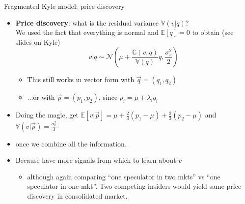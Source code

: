 \documentclass[english,10pt
,aspectratio=169
]{beamer}
\begin{document}
\begin{frame}{Fragmented Kyle model: price discovery}
	\begin{itemize}
		\item \textbf{Price discovery}: what is the residual variance $\mathbb{V}(v|q)$? \\
		We used the fact that everything is normal and $\mathbb{E}[q]=0$ to obtain (see slides on Kyle)
		$$
			v|q \sim \mathcal{N} \left( \mu +\frac{\mathbb{C}(v,q)}{\mathbb{V}(q)} q, \frac{\sigma^2_v}{2} \right)
		$$
		\begin{itemize}
			\item This still works in vector form with $\vec{q}=(q_1,q_2)$
			\item ...or with $\vec{p}=(p_1,p_2)$, since $p_i = \mu + \lambda_i q_i$
		\end{itemize}
		\pause
		\item Doing the magic, get $\mathbb{E}[v|\vec{p}] = \mu + \frac{2}{3}(p_1 - \mu) + \frac{2}{3}(p_2 - \mu)$ and $\mathbb{V}(v|\vec{p}) = \frac{\sigma^2_v}{3}$
		\item {} once we combine all the information.
		\item Because have more signals from which to learn about $v$ 
		\pause 
		\begin{itemize}
			\item although again comparing ``one speculator in two mkts'' vs ``one speculator in one mkt''. Two competing insiders would yield \alert{same price discovery} in consolidated market.
		\end{itemize}
	\end{itemize}
\end{frame}
\end{document}
